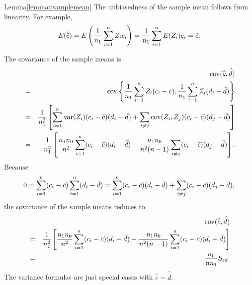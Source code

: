  

\begin{myproof}{Lemma}{\ref{lemma::samplemean}}
The unbiasedness of the sample mean follows from linearity. For example,
$$
E( \hat{\bar{c}} ) = E\left(   \frac{1}{n_1} \sum_{i=1}^n Z_i c_i \right) =   \frac{1}{n_1} \sum_{i=1}^n E(Z_i) c_i =  \bar{c} .
$$

The covariance of the sample means is
\begin{eqnarray*}
&&\textup{cov}( \hat{\bar{c}} ,  \hat{\bar{d}}  ) \\
&=& \textup{cov}\left\{      \frac{1}{n_1} \sum_{i=1}^n Z_i (c_i -  \bar{c}  ) ,   \frac{1}{n_1} \sum_{i=1}^n Z_i (d_i -  \bar{d}   )\right\} \\
&=& \frac{1}{n_1^2} \left[ \sum_{i=1}^n \textup{var}(Z_i) (c_i -  \bar{c}  ) (d_i -  \bar{d}   ) + 
\sum_{i\neq j} \textup{cov}(Z_i, Z_j) (c_i -  \bar{c}  )(d_j -  \bar{d}   ) 
\right] \\
&=& \frac{1}{n_1^2} \left[ \frac{n_1 n_0}{n^2} \sum_{i=1}^n   (c_i -  \bar{c}  )(d_i -  \bar{d}   )
-\frac{n_1 n_0 } { n^2 (n-1)  }
\sum_{i\neq j}  (c_i -  \bar{c}  )(d_j -  \bar{d}   ) 
\right] .
\end{eqnarray*}
Because 
$$
0 =   \sum_{i=1}^n   (c_i -  \bar{c}  )  \sum_{i=1}^n   (d_i -  \bar{d}   )  
= 
\sum_{i=1}^n   (c_i -  \bar{c}  )(d_i -  \bar{d}   )   + 
\sum_{i\neq j}  (c_i -  \bar{c}  )(d_j -  \bar{d}   ) ,
$$
the covariance of the sample means reduces to
\begin{eqnarray*}
&&\textup{cov}( \hat{\bar{c}} ,  \hat{\bar{d}} )  \\
&=& \frac{1}{n_1^2} \left[ \frac{n_1 n_0}{n^2} \sum_{i=1}^n   (c_i -  \bar{c}  ) (d_i -  \bar{d}   ) 
+\frac{n_1 n_0 } { n^2 (n-1)  }
\sum_{i=1}^n   (c_i -  \bar{c}  ) (d_i -  \bar{d}  ) 
\right]  \\
&=& \frac{n_0}{nn_1} S_{cd}.
\end{eqnarray*}
The variance formulas are just special cases with $ \hat{\bar{c}}  =  \hat{\bar{d}}  $. 
\end{myproof}




